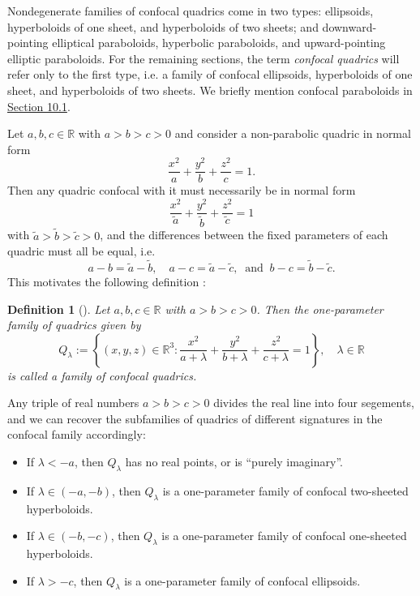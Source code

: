 \documentclass[12pt,a4paper]{article}
\theoremstyle{BoldTopSpacing}
\theoremstyle{BoldTopSpacing}
\theoremstyle{BoldTopSpacing}
\theoremstyle{BoldTopBottomSpacing}
\newtheorem{definition}{Definition}[section]
\theoremstyle{BoldTopSpacing}
\theoremstyle{BoldTopBottomSpacing}
\theoremstyle{remark}
\begin{document}
Nondegenerate families of confocal quadrics come in two types: ellipsoids, hyperboloids of one sheet, and hyperboloids of two sheets; and downward-pointing elliptical paraboloids, hyperbolic paraboloids, and upward-pointing elliptic paraboloids. For the remaining sections, the term \textit{confocal quadrics} will refer only to the first type, i.e. a family of confocal ellipsoids, hyperboloids of one sheet, and hyperboloids of two sheets. We briefly mention confocal paraboloids in \hyperref[subsec:confocal-paraboloids]{Section 10.1}.\par

Let $a, b, c \in \mathbb{R}$ with $a > b > c > 0$ and consider a non-parabolic quadric in normal form
\[
    \frac{x^2}{a} + \frac{y^2}{b} + \frac{z^2}{c} = 1.
\]
Then any quadric confocal with it must necessarily be in normal form
\[
    \frac{x^2}{\tilde{a}} + \frac{y^2}{\tilde{b}} + \frac{z^2}{\tilde{c}} = 1
\]
with $\tilde{a} > \tilde{b} > \tilde{c} > 0$, and the differences between the fixed parameters of each quadric must all be equal, i.e.
\[
    a - b = \tilde{a} - \tilde{b}, \quad a - c = \tilde{a} - \tilde{c}, \ \text{ and } \  b - c = \tilde{b} - \tilde{c}.
\]
This motivates the following definition \cite{geometryIII}:

\begin{definition}[]
\label{def:family-of-confocal-quadrics}
Let $a, b, c \in \mathbb{R}$ with $a > b > c > 0$. Then the one-parameter family of quadrics given by
\[
    Q_{\lambda} := \left\{ (x, y, z) \in \mathbb{R}^3 : \frac{x^2}{a + \lambda} + \frac{y^2}{b + \lambda} + \frac{z^2}{c + \lambda} = 1 \right\}, \quad \lambda \in \mathbb{R}
\]
is called a family of confocal quadrics.
\end{definition}

Any triple of real numbers $a > b > c > 0$ divides the real line into four segements, and we can recover the subfamilies of quadrics of different signatures in the confocal family accordingly:

\begin{itemize}
    \item If $\lambda < -a$, then $Q_{\lambda}$ has no real points, or is \enquote{purely imaginary}.
    \item If $\lambda \in (-a, -b)$, then $Q_{\lambda}$ is a one-parameter family of confocal two-sheeted hyperboloids.
    \item If $\lambda \in (-b, -c)$, then $Q_{\lambda}$ is a one-parameter family of confocal one-sheeted hyperboloids.
    \item If $\lambda > -c$, then $Q_{\lambda}$ is a one-parameter family of confocal ellipsoids. \par
\end{itemize}
\end{document}
